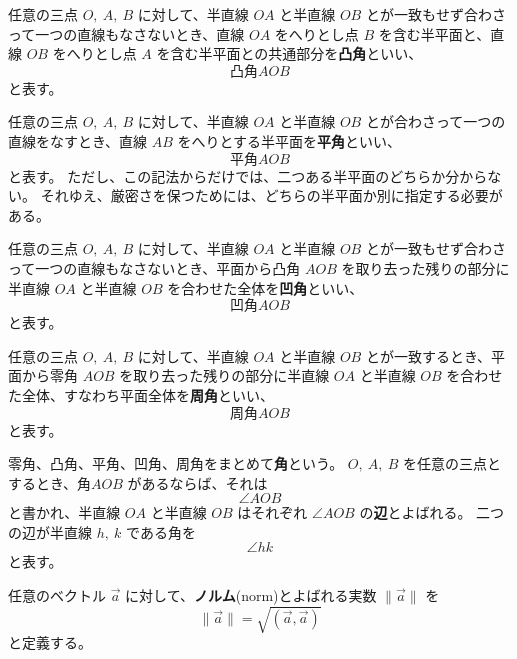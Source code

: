 \begin{dfn}[凸角]\label{definition:12}
  任意の三点 \(O,\ A,\ B\) に対して、半直線 \(OA\) と半直線 \(OB\) とが一致もせず合わさって一つの直線もなさないとき、直線 \(OA\) をへりとし点 \(B\) を含む半平面と、直線 \(OB\) をへりとし点 \(A\) を含む半平面との共通部分を\textbf{凸角}といい、
  \[\text{凸角} AOB\]
  と表す。
\end{dfn}

\begin{dfn}[平角]\label{definition:13}
  任意の三点 \(O,\ A,\ B\) に対して、半直線 \(OA\) と半直線 \(OB\) とが合わさって一つの直線をなすとき、直線 \(AB\) をへりとする半平面を\textbf{平角}といい、
  \[\text{平角} AOB\]
  と表す。
  ただし、この記法からだけでは、二つある半平面のどちらか分からない。
  それゆえ、厳密さを保つためには、どちらの半平面か別に指定する必要がある。
\end{dfn}

\begin{dfn}[凹角]\label{definition:14}
  任意の三点 \(O,\ A,\ B\) に対して、半直線 \(OA\) と半直線 \(OB\) とが一致もせず合わさって一つの直線もなさないとき、平面から凸角 \(AOB\) を取り去った残りの部分に半直線 \(OA\) と半直線 \(OB\) を合わせた全体を\textbf{凹角}といい、
  \[\text{凹角} AOB\]
  と表す。
\end{dfn}

\begin{dfn}[周角]\label{definition:15}
  任意の三点 \(O,\ A,\ B\) に対して、半直線 \(OA\) と半直線 \(OB\) とが一致するとき、平面から零角 \(AOB\) を取り去った残りの部分に半直線 \(OA\) と半直線 \(OB\) を合わせた全体、すなわち平面全体を\textbf{周角}といい、
  \[\text{周角} AOB\]
  と表す。
\end{dfn}

\begin{dfn}[角、辺]\label{definition:16}
  零角、凸角、平角、凹角、周角をまとめて\textbf{角}という。
  \(O,\ A,\ B\) を任意の三点とするとき、\(\text{角} AOB\) があるならば、それは
  \[\angle AOB\]
  と書かれ、半直線 \(OA\) と半直線 \(OB\) はそれぞれ \(\angle AOB\) の\textbf{辺}とよばれる。
  二つの辺が半直線 \(h,\ k\) である角を
  \[\angle hk\]
  と表す。
\end{dfn}

\begin{dfn}[ノルム]\label{definition:17}
  任意のベクトル \(\vec{a}\) に対して、\textbf{ノルム}(norm)とよばれる実数 \(\|\vec{a}\|\) を
  \[\|\vec{a}\|=\sqrt{(\vec{a},\vec{a})}\]
  と定義する。
\end{dfn}

